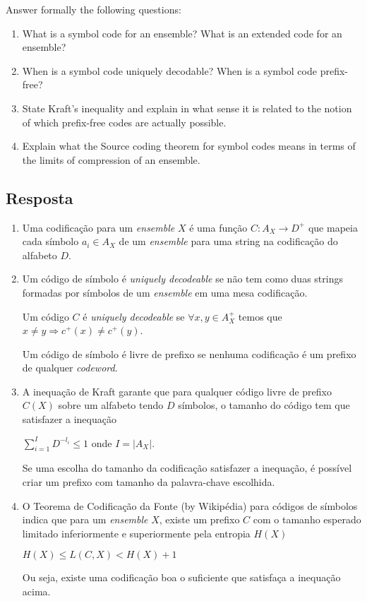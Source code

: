 Answer formally the following questions:

\begin{enumerate}
	\item What is a symbol code for an ensemble? What is an extended code for an ensemble?
	\item When is a symbol code uniquely decodable? When is a symbol code prefix-free?
	\item State Kraft's inequality and explain in what sense it is related to the notion of which prefix-free codes are actually possible.
	\item Explain what the Source coding theorem for symbol codes means in terms of the limits of compression of an ensemble.
\end{enumerate}

\subsection*{Resposta}

\begin{enumerate}
    \item Uma codificação para um \textit{ensemble} $X$ é uma função $C: A_X \rightarrow D^+$ que mapeia cada símbolo $a_i \in A_X$ de um \textit{ensemble} para uma string na codificação do alfabeto $D$.
    
    \item Um código de símbolo é \textit{uniquely decodeable} se não tem como duas strings formadas por símbolos de um \textit{ensemble} em uma mesa codificação.
    
    Um código $C$ é \textit{uniquely decodeable} se $\forall x, y \in A_{X}^+$ temos que $x \ne y \Rightarrow c^+(x) \ne c^+(y)$.
    
    Um código de símbolo é livre de prefixo se nenhuma codificação é um prefixo de qualquer \textit{codeword}.
    
    \item A inequação de Kraft garante que para qualquer código livre de prefixo $C(X)$ sobre um alfabeto tendo $D$ símbolos, o tamanho do código tem que satisfazer a inequação
    
    $\displaystyle \sum_{i=1}^{I}{D^{-l_i}} \le 1 $ onde $I = |A_X|$.
    
    Se uma escolha do tamanho da codificação satisfazer a inequação, é possível criar um prefixo com tamanho da palavra-chave escolhida.
    
    \item O Teorema de Codificação da Fonte (by Wikipédia) para códigos de símbolos indica que para um \textit{ensemble} $X$, existe um prefixo $C$ com o tamanho esperado limitado inferiormente e superiormente pela entropia $H(X)$
    
    $\displaystyle H(X) \le L(C, X) < H(X) + 1$
    
    Ou seja, existe uma codificação boa o suficiente que satisfaça a inequação acima.
    
\end{enumerate}
